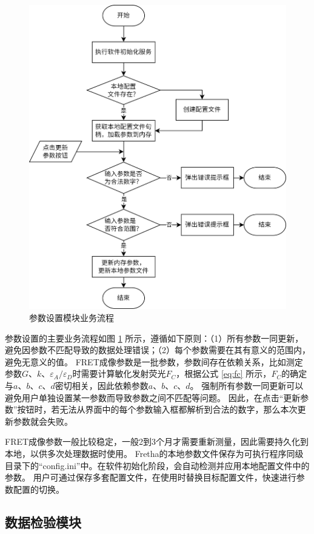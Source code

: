 \begin{figure}[hbtp]
  \centering
  \includegraphics[height=\linewidth]{../figures/2/Fretha业务-参数设置.drawio.png}
  \caption{参数设置模块业务流程}
  \label{fig:fretha_param_module_flow}
\end{figure}
参数设置的主要业务流程如图 \ref{fig:fretha_param_module_flow} 所示，遵循如下原则：（1）所有参数一同更新，避免因参数不匹配导致的数据处理错误；（2）每个参数需要在其有意义的范围内，避免无意义的值。
FRET成像参数是一批参数，参数间存在依赖关系，比如测定参数$G$、$k$、$\varepsilon_{A}/\varepsilon_{D}$时需要计算敏化发射荧光$F_C$，根据公式 \ref{eq:fc} 所示，$F_C$的确定与$a$、$b$、$c$、$d$密切相关，因此依赖参数$a$、$b$、$c$、$d$。
强制所有参数一同更新可以避免用户单独设置某一参数而导致参数之间不匹配等问题。
因此，在点击“更新参数”按钮时，若无法从界面中的每个参数输入框都解析到合法的数字，那么本次更新参数就会失败。

FRET成像参数一般比较稳定，一般2到3个月才需要重新测量，因此需要持久化到本地，以供多次处理数据时使用。
Fretha的本地参数文件保存为可执行程序同级目录下的“config.ini”中。在软件初始化阶段，会自动检测并应用本地配置文件中的参数。
用户可通过保存多套配置文件，在使用时替换目标配置文件，快速进行参数配置的切换。

\subsection{数据检验模块}
\label{sec:数据检验模块}

